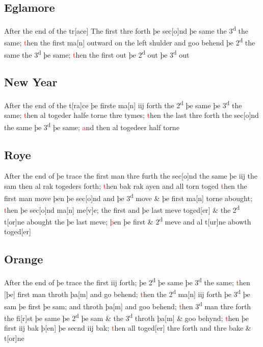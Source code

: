 \documentclass[12pt,letter]{article} %
\newcommand{\red}[1]{\textcolor{red}{#1}}
\newcommand{\srcpg}[1]{
    \noindent{
        \color{Gray}{\rule[0.5ex]{\linewidth}{1pt}~#1} 
    
    }
}
\begin{document}
\subsection{Eglamore}
After the end of the tr{[}ace{]} \srcpg{65} The first thre forth þe
sec{[}o{]}nd þe same the 3\textsuperscript{d} the same; \red{t}hen the first
ma{[}n{]} outward on the left shulder and goo behend þe
2\textsuperscript{d} the same the 3\textsuperscript{d} þe same; \red{t}hen the
first out þe 2\textsuperscript{d} out þe 3\textsuperscript{d} out

\subsection{New Year}
After the end of the t{[}ra{]}ce þe firste ma{[}n{]} iij forth the
2\textsuperscript{d} þe same þe 3\textsuperscript{d} the same; \red{t}hen al
togeder halfe torne thre tymes; \red{t}hen the last thre forth the
sec{[}o{]}nd the same þe 3\textsuperscript{d} þe same; \red{a}nd then al
togedeer half torne

\subsection{Roye}
After the end of þe trace the first man thre furth the sec{[}o{]}nd the
 same þe iij the sam then al rak togeders forth; \red{t}hen bak rak ayen and
all torn toged \red{t}hen the first man move þen þe sec{[}o{]}nd and þe
3\textsuperscript{d} move \& þe first ma{[}n{]} \srcpg{66} torne
abought; \red{t}hen þe sec{[}o{]}nd ma{[}n{]} me{[}v{]}e; the first and þe
last meve toged{[}er{]} \& the 2\textsuperscript{d} t{[}or{]}ne abought
the þe last meve; \red{þ}en þe first \& 2\textsuperscript{d} meve and al
t{[}ur{]}ne abowth toged{[}er{]}

\subsection{Orange}
After the end of þe trace the first iij forth; þe 2\textsuperscript{d}
þe same þe 3\textsuperscript{d} the same; \red{t}hen {[}þe{]} first man throth
þa{[}m{]} and go behend; \red{t}hen the 2\textsuperscript{d} ma{[}n{]} iij
forth þe 3\textsuperscript{d} þe sam þe first þe sam; and throth
þa{[}m{]} and goo behend; \red{t}hen 3\textsuperscript{d} man thre forth the 
fi{[}r{]}st þe same þe 2\textsuperscript{d} þe sam \& the
3\textsuperscript{d} throth þa{[}m{]} \& goo behynd; \red{t}hen þe first iij
bak þ{[}en{]} þe secnd iij bak; \red{t}hen all toged{[}er{]} thre forth and
thre bake \& t{[}or{]}ne
\end{document}
